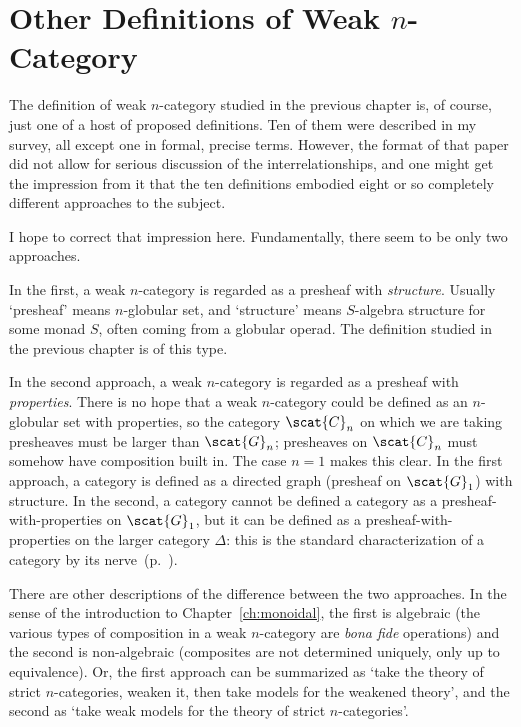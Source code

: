 
\chapter{Other Definitions of Weak $n$-Category}


%
%
\noindent
The definition of weak $n$-category studied in the previous chapter is, of
course, just one of a host of proposed definitions.  Ten of them were
described in my~\cite{SDN} survey, all except one in formal, precise terms.
However, the format of that paper did not allow for serious discussion of
the interrelationships, and one might get the impression from it that the
ten definitions embodied eight or so completely different approaches to the
subject.

I hope to correct that impression here.  Fundamentally, there seem to be
only two approaches.

In the first, a weak $n$-category is regarded as a presheaf%
%
%
with
\emph{structure}.%
%
%
%
%
Usually `presheaf' means $n$-globular set,
and `structure' means $S$-algebra structure for some monad $S$, often
coming from a globular operad.  The definition studied in the previous
chapter is of this type.  

In the second approach, a weak $n$-category is regarded as a presheaf with
\emph{properties}.%
%
%  
 There is no hope that a weak $n$-category could be
defined as an $n$-globular set with properties, so the category
$\scat{C}_n$ on which we are taking presheaves must be larger than
$\scat{G}_n$; presheaves on $\scat{C}_n$ must somehow have composition
built in.  The case $n=1$ makes this clear.  In the first approach, a
category is defined as a directed graph (presheaf on $\scat{G}_1$) with
structure.  In the second, a category cannot be defined a category as a
presheaf-with-properties on $\scat{G}_1$, but it can be defined as a
presheaf-with-properties on the larger category $\Delta$:%
%
%
this is the
standard characterization of a category by its
nerve~(p.~\pageref{p:defn-nerve}).%
%
%
 

There are other descriptions of the difference between the two approaches.
In the sense of the introduction to Chapter~\ref{ch:monoidal}, the first is
algebraic%
%
%
(the various types of composition in a weak $n$-category are
\emph{bona fide} operations) and the second is non-algebraic (composites
are not determined uniquely, only up to equivalence).  Or, the first
approach can be summarized as `take the theory of strict $n$-categories,
weaken%
%
%
it, then take models for the weakened theory', and the second as
`take weak models for the theory of strict $n$-categories'.%
%
%


